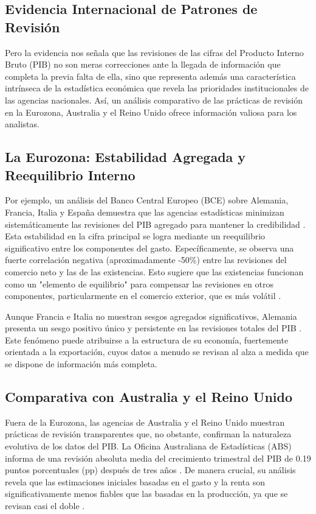 \documentclass{article}
\begin{document}
\subsection{Evidencia Internacional de Patrones de Revisión}

Pero la evidencia nos señala que las revisiones de las cifras del Producto Interno Bruto (PIB) no son meras correcciones ante la llegada de información que completa la previa falta de ella, sino que representa además una característica intrínseca de la estadística económica que revela las prioridades institucionales de las agencias nacionales. Así, un análisis comparativo de las prácticas de revisión en la Eurozona, Australia y el Reino Unido ofrece información valiosa para los analistas.

\subsection*{La Eurozona: Estabilidad Agregada y Reequilibrio Interno}
Por ejemplo, un análisis del Banco Central Europeo (BCE) sobre Alemania, Francia, Italia y España demuestra que las agencias estadísticas minimizan sistemáticamente las revisiones del PIB agregado para mantener la credibilidad \cite{bce_wp_2857}. Esta estabilidad en la cifra principal se logra mediante un reequilibrio significativo entre los componentes del gasto. Específicamente, se observa una fuerte correlación negativa (aproximadamente -50\%) entre las revisiones del comercio neto y las de las existencias. Esto sugiere que las existencias funcionan como un "elemento de equilibrio" para compensar las revisiones en otros componentes, particularmente en el comercio exterior, que es más volátil \cite{bce_wp_2857}.

Aunque Francia e Italia no muestran sesgos agregados significativos, Alemania presenta un sesgo positivo único y persistente en las revisiones totales del PIB \cite{bce_wp_2857}. Este fenómeno puede atribuirse a la estructura de su economía, fuertemente orientada a la exportación, cuyos datos a menudo se revisan al alza a medida que se dispone de información más completa.

\subsection*{Comparativa con Australia y el Reino Unido}
Fuera de la Eurozona, las agencias de Australia y el Reino Unido muestran prácticas de revisión transparentes que, no obstante, confirman la naturaleza evolutiva de los datos del PIB. La Oficina Australiana de Estadísticas (ABS) informa de una revisión absoluta media del crecimiento trimestral del PIB de 0.19 puntos porcentuales (pp) después de tres años \cite{abs_revisions}. De manera crucial, su análisis revela que las estimaciones iniciales basadas en el gasto y la renta son significativamente menos fiables que las basadas en la producción, ya que se revisan casi el doble \cite{abs_revisions}.
\end{document}
